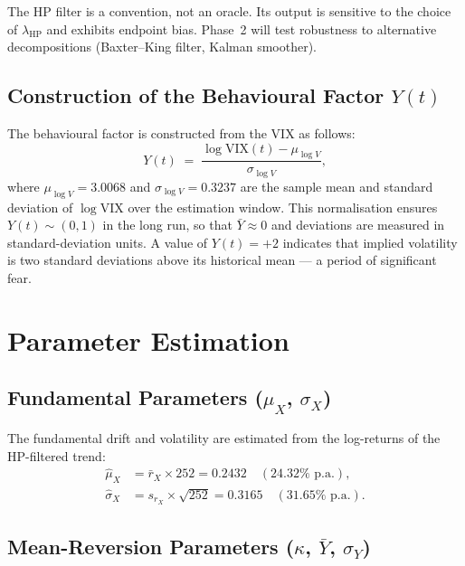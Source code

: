 \documentclass[12pt,a4paper]{article}
\theoremstyle{definition}
\theoremstyle{remark}
\begin{document}
\begin{limitbox}
  The HP filter is a convention, not an oracle. Its output is sensitive
  to the choice of $\lambda_{\mathrm{HP}}$ and exhibits endpoint bias.
  Phase~2 will test robustness to alternative decompositions
  (Baxter--King filter, Kalman smoother).
\end{limitbox}

\subsection{Construction of the Behavioural Factor $Y(t)$}

The behavioural factor is constructed from the VIX as follows:
\begin{equation}
  Y(t) \;=\; \frac{\log \mathrm{VIX}(t) - \mu_{\log V}}{\sigma_{\log V}},
\end{equation}
where $\mu_{\log V} = 3.0068$ and $\sigma_{\log V} = 0.3237$ are the
sample mean and standard deviation of $\log \mathrm{VIX}$ over the
estimation window. This normalisation ensures $Y(t) \sim (0, 1)$ in the
long run, so that $\bar{Y} \approx 0$ and deviations are measured in
standard-deviation units. A value of $Y(t) = +2$ indicates that implied
volatility is two standard deviations above its historical mean ---
a period of significant fear.

\section{Parameter Estimation}
\label{sec:estimation}

\subsection{Fundamental Parameters ($\mu_X$, $\sigma_X$)}

The fundamental drift and volatility are estimated from the log-returns
of the HP-filtered trend:
\begin{align}
  \hat{\mu}_X &= \bar{r}_X \times 252 = 0.2432 \quad (24.32\%\text{ p.a.}),\\
  \hat{\sigma}_X &= s_{r_X} \times \sqrt{252} = 0.3165 \quad (31.65\%\text{ p.a.}).
\end{align}

\subsection{Mean-Reversion Parameters ($\kappa$, $\bar{Y}$, $\sigma_Y$)}
\end{document}
